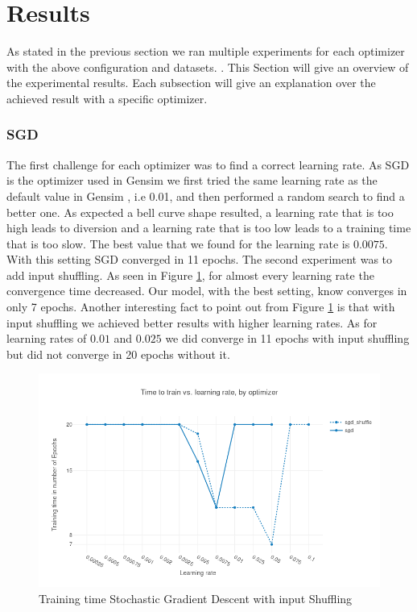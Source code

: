 

\section{Results}\label{sec:results}
As stated in the previous section we ran multiple experiments for each optimizer with the above configuration and datasets. . This Section will  give an overview of the experimental results. Each subsection will give an explanation over the achieved result with a specific optimizer.

\subsubsection{SGD}
The first challenge for each optimizer was to find a correct learning rate. As SGD is the optimizer used in Gensim \cite{gensim} we first tried the same learning rate as the default value in Gensim \cite{gensim}, i.e 0.01,  and then performed a random search to find a better one. As expected a bell curve shape resulted, a learning rate that is too high leads to diversion and a learning rate that is too low leads to a training time that is too slow. The best value that we found for the learning rate is $0.0075$. With this setting SGD converged in 11 epochs. The second experiment was to add input shuffling.
As seen in Figure \ref{fig:results_sgd}, for almost every learning rate the convergence time decreased. Our model, with the best setting, know converges in only 7 epochs. Another interesting fact to point out from Figure \ref{fig:results_sgd} is that with input shuffling we achieved better results with higher learning rates. As for learning rates of $0.01$ and $0.025$ we did converge in 11 epochs with input shuffling but did not converge in 20 epochs without it.

\begin{figure}[h]
\centering
\includegraphics[scale=0.3]{images/results_sgd_shuffle}
\caption{Training time Stochastic Gradient Descent with input Shuffling}
\label{fig:results_sgd}
\end{figure}
